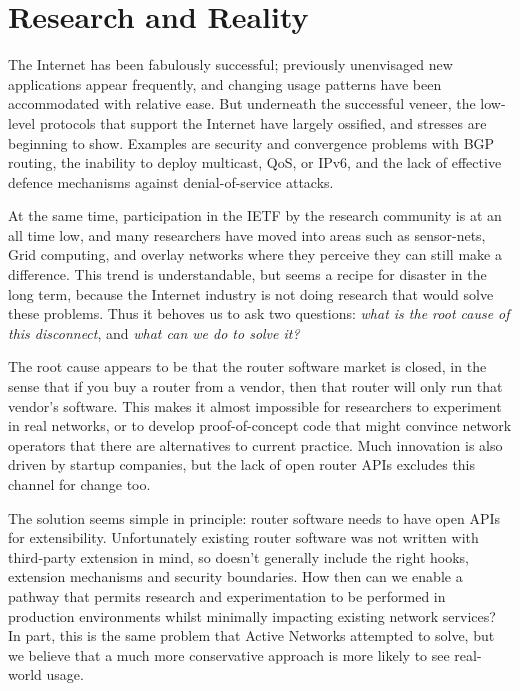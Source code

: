 
\section{Research and Reality}

The Internet has been fabulously successful; previously unenvisaged
new applications appear frequently, and changing usage patterns have
been accommodated with relative ease.  But underneath the successful
veneer, the low-level protocols that support the Internet have largely
ossified, and stresses are beginning to show.  Examples are security
and convergence problems with BGP routing, the inability to deploy
multicast, QoS, or IPv6, and the lack of effective defence mechanisms
against denial-of-service attacks.

At the same time, participation in the IETF by the research
community is at an all time low, and many researchers
have moved into areas such
as sensor-nets, Grid computing, and overlay networks where they
perceive they can still make a difference.  This trend is
understandable, but seems a recipe for disaster in the long term,
because the Internet industry is not doing research that would
solve these problems. Thus it behoves us to ask two questions: {\it
what is the root cause of this disconnect}, and {\it what can we do to
solve it?}

The root cause appears to be that the router software market is
closed, in the sense that if you buy a router from a vendor, then that
router will only run that vendor's software.  This makes it almost
impossible for researchers to experiment in real networks, or to
develop proof-of-concept code that might convince network operators
that there are alternatives to current practice.  Much innovation is
also driven by startup companies, but the lack of open router APIs
excludes this channel for change too.

The solution seems simple in principle: router software needs to have
open APIs for extensibility.  Unfortunately existing router software
was not written with third-party extension in mind, so doesn't
generally include the right hooks, extension mechanisms and security
boundaries.  
How then can we enable a pathway that permits research and
experimentation to be performed in production environments whilst
minimally impacting existing network services?  In part, this
is the same problem that Active Networks attempted to solve, but we
believe that a much more conservative approach is more likely to see
real-world usage.

